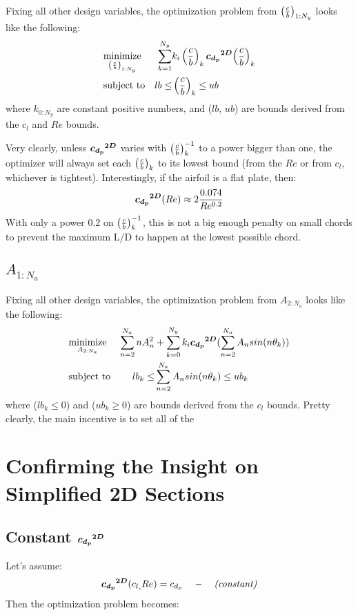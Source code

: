\documentclass[letterpaper,12pt]{article}
\begin{document}
Fixing all other design variables, the optimization problem from $\left( \frac c b \right)_{1:N_y}$ looks like the following:
\begin{align*}
	& \underset{\left( \frac c b \right)_{1:N_y}}{\text{minimize}}  &
	\sum_{k=1}^{N_y} &k_i \left( \frac c b \right)_{k} \boldsymbol{{c_{d_p}}^{2D}}{\left( \frac c b \right)_{k}}  \\
	& \text{subject to} & lb \leq & \left( \frac c b \right)_{k} \leq ub
\end{align*}
where $k_{0:N_y}$ are constant positive numbers, 
and ($lb$, $ub$) are bounds derived from the $c_l$ and $Re$ bounds.

Very clearly, unless $\boldsymbol{{c_{d_p}}^{2D}}$ varies with $\left( \frac c b \right)_{k}^{-1}$ to a power bigger than one,
the optimizer will always set each $\left( \frac c b \right)_{k}$ to its lowest bound 
(from the $Re$ or from $c_l$, whichever is tightest).
Interestingly, if the airfoil is a flat plate, then:
$$\boldsymbol{{c_{d_p}}^{2D}}(Re) \approx 2 \frac{0.074}{Re^{0.2}}$$
With only a power 0.2 on $\left( \frac c b \right)_{k}^{-1}$, this is not a big enough penalty on small chords to prevent the maximum L/D to happen at the lowest possible chord.

\subsection{$A_{1:N_a}$}

Fixing all other design variables, the optimization problem from $A_{2:N_a}$ looks like the following:
\begin{align*}
	& \underset{A_{2:N_a}}{\text{minimize}}  &
	 \sum_{n=2}^{N_a} nA_n^2   &+  \sum_{k=0}^{N_y} k_i \boldsymbol{{c_{d_p}}^{2D}}(\sum_{n=2}^{N_a} A_n sin(n \theta_k))\\
	& \text{subject to} & lb_k \leq & \sum_{n=2}^{N_a} A_n sin(n \theta_k) \leq ub_k
\end{align*}
where ($lb_k \leq 0$) and ($ub_k \geq 0$) are bounds derived from the $c_l$ bounds.
Pretty clearly, the main incentive is to set all of the 

\section{Confirming the Insight on Simplified 2D Sections}
\subsection{Constant $\boldsymbol{{c_{d_p}}^{2D}}$}

Let's assume:
$$\boldsymbol{{c_{d_p}}^{2D}}({c_l}_{\bf ,} Re) = {c_{d_p}}_{\bf \quad} - \quad \text{\it (constant)}$$
Then the optimization problem becomes:
\end{document}
